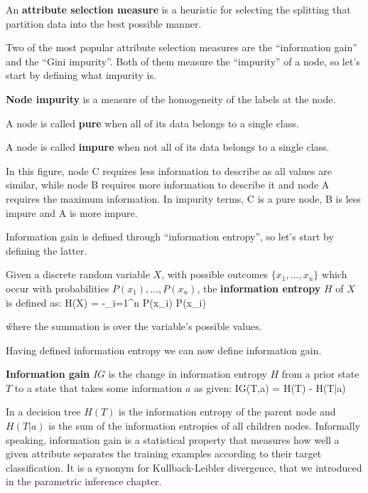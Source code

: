 An \textbf{attribute selection measure} is a heuristic for selecting the splitting that partition data into the best
possible manner.
\ed

Two of the most popular attribute selection measures are the ``information gain'' and the ``Gini impurity''. Both of
them measure the ``impurity'' of a node, so let's start by defining what impurity is.

\textbf{Node impurity} is a measure of the homogeneity of the labels at the node.
\ed

A node is called \textbf{pure} when all of its data belongs to a single class.
\ed

A node is called \textbf{impure} when not all of its data belongs to a single class.
\ed

\be
In this figure, node C requires less information to describe as all values are similar, while node B requires more
information to describe it and node A requires the maximum information. In impurity terms, C is a pure node, B is less
impure and A is more impure.

\ee

Information gain is defined through ``information entropy'', so let's start by defining the latter.

Given a discrete random variable $X$, with possible outcomes $\{x_{1}, \ldots, x_{n} \}$ which occur with probabilities
$P(x_{1}), \ldots, P (x_{n})$, the \textbf{information entropy} $H$ of $X$ is defined as:
\bse
H(X) = -\sum _{i=1}^{n} {P(x_{i}) \log P(x_{i})}
\ese

\v

where the summation is over the variable's possible values.
\ed

Having defined information entropy we can now define information gain.

\textbf{Information gain} $IG$ is the change in information entropy $H$ from a prior state $T$ to a state that takes
some information $a$ as given:
\bse
IG(T,a) = H(T) - H(T|a)
\ese
\ed

In a decision tree $H(T)$ is the information entropy of the parent node and $H(T|a)$ is the sum of the information
entropies of all children nodes. Informally speaking, information gain is a statistical property that measures how
well a given attribute separates the training examples according to their target classification. It is a synonym for
Kullback-Leibler divergence, that we introduced in the parametric inference chapter.

